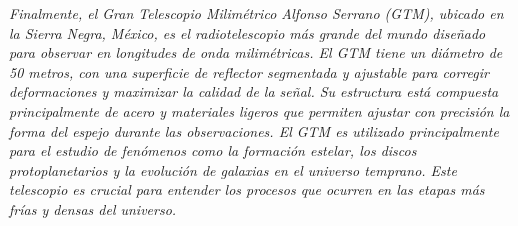 \documentclass{article}
\begin{document}
\textit{Finalmente, el Gran Telescopio Milimétrico Alfonso Serrano (GTM), ubicado en la Sierra Negra, México, es el radiotelescopio más grande del mundo diseñado para observar en longitudes de onda milimétricas. El GTM tiene un diámetro de 50 metros, con una superficie de reflector segmentada y ajustable para corregir deformaciones y maximizar la calidad de la señal. Su estructura está compuesta principalmente de acero y materiales ligeros que permiten ajustar con precisión la forma del espejo durante las observaciones. El GTM es utilizado principalmente para el estudio de fenómenos como la formación estelar, los discos protoplanetarios y la evolución de galaxias en el universo temprano. Este telescopio es crucial para entender los procesos que ocurren en las etapas más frías y densas del universo.}\\
\end{document}
